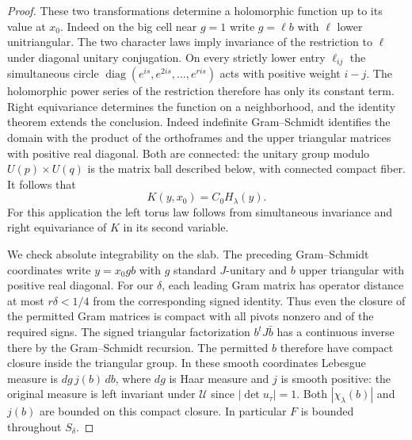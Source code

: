 \begin{proof}
These two transformations determine a holomorphic function up to its
value at $x_0$. Indeed on the big cell near $g=1$ write $g=\ell b$
with $\ell$ lower unitriangular. The two character laws imply
invariance of the restriction to $\ell$ under diagonal unitary
conjugation. On every strictly lower entry $\ell_{ij}$ the simultaneous
circle $\operatorname{diag}(e^{is},e^{2is},\ldots,e^{ris})$ acts with
positive weight $i-j$. The holomorphic power series of the restriction
therefore has only its constant term. Right equivariance determines
the function on a neighborhood, and the identity theorem extends the
conclusion. Indeed indefinite Gram--Schmidt identifies the domain with
the product of the orthoframes and the upper triangular matrices with
positive real diagonal. Both are connected: the unitary group modulo
$U(p)\times U(q)$ is the matrix ball described below, with connected
compact fiber. It follows that
\[
               K(y,x_0)=C_0H_\lambda(y).
\]
For this application the left torus law follows from simultaneous
invariance and right equivariance of $K$ in its second variable.

We check absolute integrability on the slab. The preceding
Gram--Schmidt coordinates write $y=x_0 g b$ with $g$ standard
$J$-unitary and $b$ upper triangular with positive real diagonal.
For our $\delta$, each leading Gram matrix has operator distance
at most $r\delta<1/4$ from the corresponding signed identity. Thus
even the closure of the permitted Gram matrices is compact with all
pivots nonzero and of the required signs. The signed triangular
factorization $b^tJ\bar b$ has a continuous inverse there by the
Gram--Schmidt recursion. The permitted $b$ therefore have compact
closure inside the triangular group. In these smooth coordinates
Lebesgue measure is $dg\,j(b)\,db$, where $dg$ is Haar measure and
$j$ is smooth positive: the original measure is left invariant
under $\mathcal U$ since $|\det u_\tau|=1$. Both $|\chi_\lambda(b)|$
and $j(b)$ are bounded on this compact closure. In particular
$F$ is bounded throughout $S_\delta$.


\end{proof}

